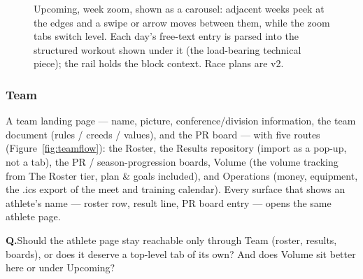 \documentclass[11pt]{article}
\newcommand{\question}[1]{\par\vspace{4pt}%
  \noindent\colorbox{kailosoft}{\parbox{\dimexpr\linewidth-2\fboxsep}{%
  \small\textcolor{kailoaccent}{\textbf{Q.}}\;#1}}\par\vspace{3pt}}
\begin{document}
\begin{figure}[H]
\caption{Upcoming, week zoom, shown as a carousel: adjacent weeks peek at
the edges and a swipe or arrow moves between them, while the zoom tabs
switch level. Each day's free-text entry is parsed into the structured
workout shown under it (the load-bearing technical piece); the rail holds
the block context. Race plans are v2.}
\label{fig:upcomingwire}
\end{figure}

\subsubsection{Team}

A team landing page --- name, picture, conference/division information, the
team document (rules / creeds / values), and the PR board --- with five
routes (Figure~\ref{fig:teamflow}): the Roster, the Results repository
(import as a pop-up, not a tab), the PR / season-progression boards,
Volume (the volume tracking from The Roster tier, plan \& goals included),
and Operations (money, equipment, the .ics export of the meet and training
calendar). Every surface that shows an athlete's name --- roster row, result
line, PR board entry --- opens the same athlete page.
\question{Should the athlete page stay reachable only through Team (roster,
results, boards), or does it deserve a top-level tab of its own? And does
Volume sit better here or under Upcoming?}
\end{document}
